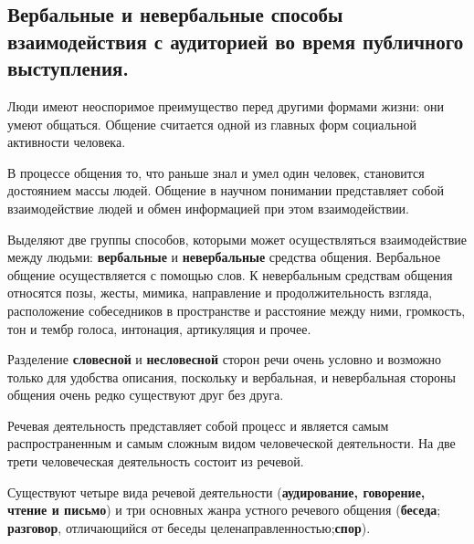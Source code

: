 \documentclass[a4paper,12pt]{article}
\begin{document}
\begin{large}

\setlength{\parindent}{20pt} %
\section{Вербальные и невербальные способы взаимодействия с аудиторией во время публичного выступления.}

\hspace{\parindent}Люди имеют неоспоримое преимущество перед другими формами жизни: они умеют общаться. 
Общение считается одной из главных форм социальной активности человека. 

 В процессе общения то, что раньше знал и умел один человек, становится достоянием массы
 людей. 
 Общение в научном понимании представляет собой взаимодействие людей и обмен
 информацией при этом взаимодействии.

 Выделяют две группы способов, которыми может осуществляться взаимодействие между людьми: \textbf{вербальные} и \textbf{невербальные} средства общения. Вербальное общение осуществляется с помощью слов. К невербальным средствам общения относятся позы, жесты, мимика, направление и продолжительность взгляда, расположение собеседников в пространстве и расстояние между ними, громкость, тон и тембр голоса, интонация,
 артикуляция и прочее.
 
 Разделение \textbf{словесной} и \textbf{несловесной} сторон речи очень условно и возможно только для удобства описания, поскольку и вербальная, и невербальная стороны общения очень редко существуют друг без друга.
 
 Речевая деятельность представляет собой процесс и является самым распространенным и самым сложным видом человеческой деятельности. На две трети человеческая деятельность
 состоит из речевой.

 Существуют четыре вида речевой деятельности (\textbf{аудирование, говорение, чтение и письмо}) и три основных жанра устного речевого общения (\textbf{беседа}; \textbf{разговор}, отличающийся от беседы целенаправленностью;\textbf{спор}).
\end{large}
\end{document}
